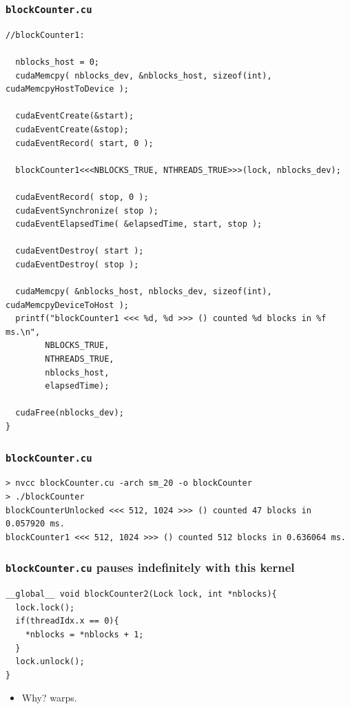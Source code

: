 \documentclass[handout]{beamer}
\numberwithin{equation}{section}
\begin{document}
\begin{frame}[fragile]
\frametitle{\tt blockCounter.cu} \lstset{basicstyle=\tiny}
\begin{lstlisting}[name=bc]
  //blockCounter1:

  nblocks_host = 0;
  cudaMemcpy( nblocks_dev, &nblocks_host, sizeof(int), cudaMemcpyHostToDevice );
  
  cudaEventCreate(&start);
  cudaEventCreate(&stop);
  cudaEventRecord( start, 0 );
  
  blockCounter1<<<NBLOCKS_TRUE, NTHREADS_TRUE>>>(lock, nblocks_dev);

  cudaEventRecord( stop, 0 );
  cudaEventSynchronize( stop );
  cudaEventElapsedTime( &elapsedTime, start, stop );

  cudaEventDestroy( start );
  cudaEventDestroy( stop ); 
  
  cudaMemcpy( &nblocks_host, nblocks_dev, sizeof(int), cudaMemcpyDeviceToHost );
  printf("blockCounter1 <<< %d, %d >>> () counted %d blocks in %f ms.\n", 
        NBLOCKS_TRUE,
        NTHREADS_TRUE,
        nblocks_host,
        elapsedTime);      
                   
  cudaFree(nblocks_dev); 
}
\end{lstlisting}
\end{frame}


\begin{frame}[fragile]
\frametitle{\tt blockCounter.cu}  \lstset{basicstyle=\tiny}
\begin{lstlisting}[name=bc]
> nvcc blockCounter.cu -arch sm_20 -o blockCounter
> ./blockCounter
blockCounterUnlocked <<< 512, 1024 >>> () counted 47 blocks in 0.057920 ms.
blockCounter1 <<< 512, 1024 >>> () counted 512 blocks in 0.636064 ms.
\end{lstlisting}
\end{frame}


\begin{frame}[fragile]
\frametitle{{\tt blockCounter.cu} pauses indefinitely with this kernel}
\begin{lstlisting}
__global__ void blockCounter2(Lock lock, int *nblocks){
  lock.lock();
  if(threadIdx.x == 0){
    *nblocks = *nblocks + 1;
  }
  lock.unlock();
}
\end{lstlisting}
\begin{itemize}
\pause \item Why? warps.
\end{itemize}
\end{frame}
\end{document}
